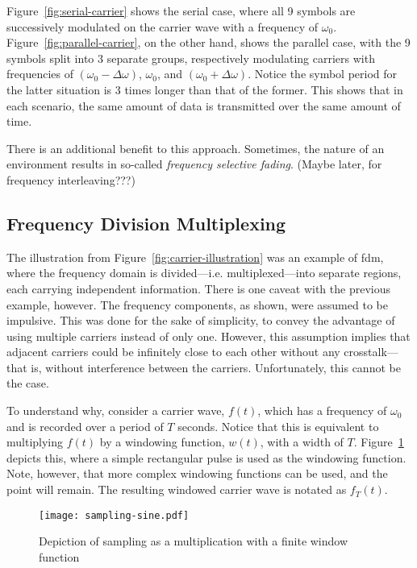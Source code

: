 \documentclass[class=report,11pt,crop=false]{standalone}
\begin{document}
Figure~\ref{fig:serial-carrier} shows the serial case, where all 9 symbols are successively modulated on the carrier wave with a frequency of \(\omega_0\). Figure~\ref{fig:parallel-carrier}, on the other hand, shows the parallel case, with the 9 symbols split into 3 separate groups, respectively modulating carriers with frequencies of \((\omega_0 - \Delta \omega)\), \(\omega_0\), and \((\omega_0 + \Delta \omega)\). Notice the symbol period for the latter situation is 3 times longer than that of the former. This shows that in each scenario, the same amount of data is transmitted over the same amount of time.

There is an additional benefit to this approach. Sometimes, the nature of an environment results in so-called \emph{frequency selective fading}. (Maybe later, for frequency interleaving???)

\subsection{Frequency Division Multiplexing}
The illustration from Figure~\ref{fig:carrier-illustration} was an example of \gls{fdm}, where the frequency domain is divided---i.e. multiplexed---into separate regions, each carrying independent information. There is one caveat with the previous example, however. The frequency components, as shown, were assumed to be impulsive. This was done for the sake of simplicity, to convey the advantage of using multiple carriers instead of only one. However, this assumption implies that adjacent carriers could be infinitely close to each other without any crosstalk---that is, without interference between the carriers. Unfortunately, this cannot be the case.

To understand why, consider a carrier wave, \(f(t)\), which has a frequency of \(\omega_0\) and is recorded over a period of \(T\) seconds. Notice that this is equivalent to multiplying \(f(t)\) by a windowing function, \(w(t)\), with a width of \(T\). Figure~\ref{fig:sampling-sine} depicts this, where a simple rectangular pulse is used as the windowing function. Note, however, that more complex windowing functions can be used, and the point will remain. The resulting windowed carrier wave is notated as \(f_T(t)\).

\begin{figure}[htbp]
    \centering
    \captionsetup{type=figure}
    \texttt{[image: sampling-sine.pdf]}
    \caption{Depiction of sampling as a multiplication with a finite window function}
    \label{fig:sampling-sine}
\end{figure}
\end{document}
